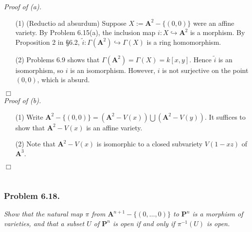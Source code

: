 \documentclass{article}
\begin{document}
\emph{Proof of (a).}
\begin{enumerate}
\item[(1)]
  (Reductio ad absurdum)
  Suppose $X := \mathbf{A}^{2} - \{(0,0)\}$ were an affine variety.
  By Problem 6.15(a), the inclusion map $i: X \hookrightarrow \mathbf{A}^{2}$
  is a morphism.
  By Proposition 2 in \S 6.2,
  $\widetilde{i}: \Gamma(\mathbf{A}^{2}) \hookrightarrow \Gamma(X)$
  is a ring homomorphism.

\item[(2)]
  Problems 6.9 shows that $\Gamma(\mathbf{A}^{2}) = \Gamma(X) = k[x,y]$.
  Hence $\widetilde{i}$ is an isomorphism, so $i$ is an isomorphism.
  However, $i$ is not surjective on the point $(0,0)$,
  which is absurd.
\end{enumerate}
$\Box$ \\



\emph{Proof of (b).}
\begin{enumerate}
\item[(1)]
  Write $\mathbf{A}^{2} - \{(0,0)\}
  = (\mathbf{A}^{2} - V(x)) \bigcup (\mathbf{A}^{2} - V(y))$.
  It suffices to show that $\mathbf{A}^{2} - V(x)$ is an affine variety.

\item[(2)]
  Note that $\mathbf{A}^{2} - V(x)$ is isomorphic to a closed subvariety
  $V(1-xz)$ of $\mathbf{A}^3$.
\end{enumerate}
$\Box$ \\\\






\subsubsection*{Problem 6.18.}
\emph{Show that the natural map $\pi$
from $\mathbf{A}^{n+1} - \{(0,\ldots,0)\}$ to $\mathbf{P}^n$ is a morphism of varieties,
and that a subset $U$ of $\mathbf{P}^n$ is open if and only if $\pi^{-1}(U)$ is open.} \\
\end{document}
